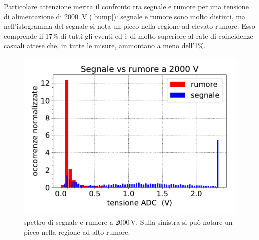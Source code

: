 Particolare attenzione merita il confronto tra segnale e rumore per una tensione di alimentazione di \SI{2000}{V} (\autoref{bump}): segnale e rumore sono molto distinti, ma nell'istogramma del segnale si nota un picco nella regione ad elevato rumore.
Esso comprende il 17\%  di tutti gli eventi ed è di molto superiore al rate di coincidenze casuali attese che, in tutte le misure, ammontano a meno dell'1\%.

\begin{figure}[h]
\centering
\includegraphics[width=10 cm]{2000}
\caption{spettro di segnale e rumore a 2000\,V. Sulla sinistra si può notare un picco nella regione ad alto rumore.}
\label{bump}
\end{figure}
